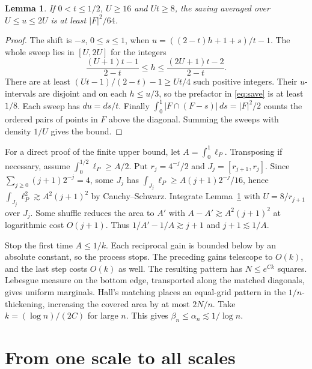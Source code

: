 \documentclass[11pt,reqno]{amsart}
\newtheorem{lemma}{Lemma}
\begin{document}
\begin{lemma}\label{lem:scale}
If $0<t\le1/2$, $U\ge16$ and $Ut\ge8$, the saving averaged over $U\le u\le2U$ is at least $|F|^2/64$.
\end{lemma}
\begin{proof}
The shift is $-s$, $0\le s\le1$, when $u=((2-t)h+1+s)/t-1$. The whole sweep lies in $[U,2U]$ for the integers
\[
 \frac{(U+1)t-1}{2-t}\le h\le\frac{(2U+1)t-2}{2-t}.
\]
There are at least $(Ut-1)/(2-t)-1\ge Ut/4$ such positive integers. Their $u$-intervals are disjoint and on each $h\le u/3$, so the prefactor in \eqref{eq:save} is at least $1/8$. Each sweep has $du=ds/t$. Finally $\int_0^1|F\cap(F-s)|\,ds=|F|^2/2$ counts the ordered pairs of points in $F$ above the diagonal. Summing the sweeps with density $1/U$ gives the bound.
\end{proof}

For a direct proof of the finite upper bound, let $A=\int_0^1\ell_P$. Transposing if necessary, assume $\int_0^{1/2}\ell_P\ge A/2$. Put $r_j=4^{-j}/2$ and $J_j=[r_{j+1},r_j]$. Since $\sum_{j\ge0}(j+1)2^{-j}=4$, some $J_j$ has $\int_{J_j}\ell_P\ge A(j+1)2^{-j}/16$, hence $\int_{J_j}\ell_P^2\gtrsim A^2(j+1)^2$ by Cauchy--Schwarz. Integrate Lemma~\ref{lem:scale} with $U=8/r_{j+1}$ over $J_j$. Some shuffle reduces the area to $A'$ with $A-A'\gtrsim A^2(j+1)^2$ at logarithmic cost $O(j+1)$. Thus $1/A'-1/A\gtrsim j+1$ and $j+1\lesssim1/A$.

Stop the first time $A\le1/k$. Each reciprocal gain is bounded below by an absolute constant, so the process stops. The preceding gains telescope to $O(k)$, and the last step costs $O(k)$ as well. The resulting pattern has $N\le e^{Ck}$ squares. Lebesgue measure on the bottom edge, transported along the matched diagonals, gives uniform marginals. Hall's matching places an equal-grid pattern in the $1/n$-thickening, increasing the covered area by at most $2N/n$. Take $k=(\log n)/(2C)$ for large $n$. This gives $\beta_n\le\alpha_n\lesssim1/\log n$.

\section{From one scale to all scales}
\end{document}
